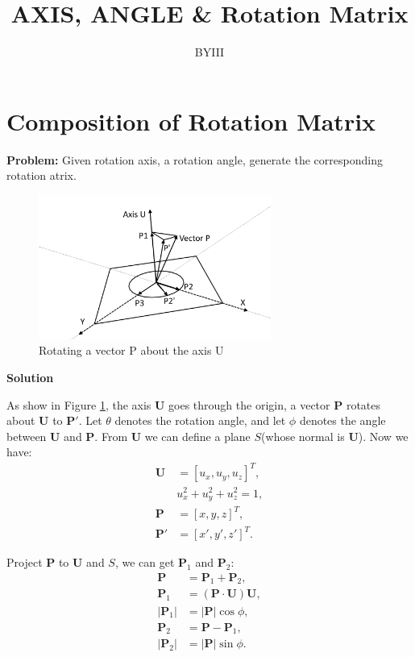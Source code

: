 \documentclass{article}
\begin{document}
\author{BYIII}
\title{AXIS, ANGLE \& Rotation Matrix}
\date{}

\maketitle

\section{Composition of Rotation Matrix}
\textbf{Problem:} Given rotation axis, a rotation angle, generate the corresponding rotation atrix.

\begin{figure}[!h]
\centering
\includegraphics[width=3in]{figures/axis_angle_rot3.png}
\caption{Rotating a vector P about the axis U}
\label{fig1}
\end{figure}

\textbf{Solution}


As show in Figure \ref{fig1}, the axis \textbf{U} goes through the origin, a vector \textbf{P} rotates about \textbf{U} to $\mathbf{P}'$. Let $\theta$ denotes the rotation angle, and let $\phi$ denotes the angle between \textbf{U} and \textbf{P}. From \textbf{U} we can define a plane $S$(whose normal is \textbf{U}). Now we have: 
\begin{displaymath}
\begin{split}
\mathbf{U} &= [u_x, u_y, u_z]^T, \\
&  u_x^2+u_y^2+u_z^2 = 1, \\
\mathbf{P} &= [x, y, z]^T, \\
\mathbf{P}' &= [x', y', z']^T.
\end{split}
\end{displaymath}

Project \textbf{P} to \textbf{U} and $S$, we can get $\mathbf{P}_1$ and $\mathbf{P}_2$:
\begin{displaymath}
\begin{split}
\mathbf{P} &= \mathbf{P}_1+\mathbf{P}_2, \\
\mathbf{P}_1 &= (\mathbf{P}\cdot\mathbf{U})\mathbf{U}, \\
|\mathbf{P}_1| &=  |\mathbf{P}|\cos{\phi}, \\
\mathbf{P}_2 &= \mathbf{P} - \mathbf{P}_1, \\
|\mathbf{P}_2| &=  |\mathbf{P}|\sin{\phi}.
\end{split}
\end{displaymath}
\end{document}
